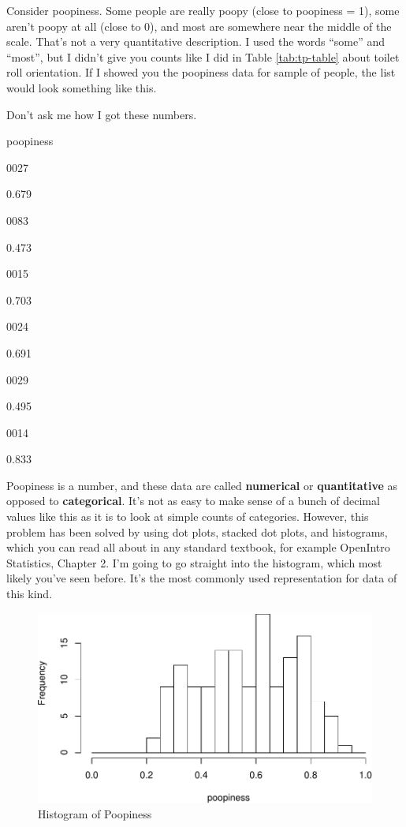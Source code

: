\documentclass[]{book}
\begin{document}
Consider poopiness. Some people are really poopy (close to poopiness = 1), some aren't poopy at all (close to 0), and most are somewhere near the middle of the scale. That's not a very quantitative description. I used the words ``some'' and ``most'', but I didn't give you counts like I did in Table \ref{tab:tp-table} about toilet roll orientation. If I showed you the poopiness data for sample of people, the list would look something like this.

\label{tab:unnamed-chunk-7}Don't ask me how I got these numbers.

poopiness

0027

0.679

0083

0.473

0015

0.703

0024

0.691

0029

0.495

0014

0.833

Poopiness is a number, and these data are called \textbf{numerical} or \textbf{quantitative} as opposed to \textbf{categorical}. It's not as easy to make sense of a bunch of decimal values like this as it is to look at simple counts of categories. However, this problem has been solved by using dot plots, stacked dot plots, and histograms, which you can read all about in any standard textbook, for example OpenIntro Statistics, Chapter 2. I'm going to go straight into the histogram, which most likely you've seen before. It's the most commonly used representation for data of this kind.

\begin{figure}
\centering
\includegraphics{bigquestions-book_files/figure-latex/poopy-hist-1.pdf}
\caption{\label{fig:poopy-hist}Histogram of Poopiness}
\end{figure}
\end{document}
